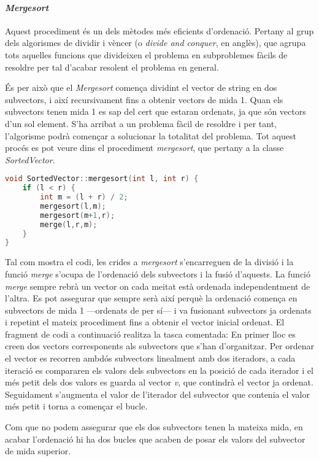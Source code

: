 \documentclass[titlepage]{article}
\begin{document}
\paragraph{\textit{Mergesort}} 
Aquest procediment és un dels mètodes més eficients d'ordenació. Pertany al grup dels algorismes de dividir i vèncer (o \textit{divide and conquer}, en anglès), que agrupa tots aquelles funcions que divideixen el problema en subproblemes fàcils de resoldre per tal d'acabar resolent el problema en general. \newline\par

És per això que el \textit{Mergesort} comença dividint el vector de string en dos subvectors, i així recursivament fins a obtenir  vectors de mida 1. Quan els subvectors tenen mida 1 es sap del cert que estaran ordenats, ja que són vectors d'un sol element. S'ha arribat a un problema fàcil de resoldre i per tant, l'algorisme podrà començar a solucionar la totalitat del problema.\newline
Tot aquest procés es pot veure dins el procediment \textit{mergesort}, que pertany a la classe \textit{SortedVector}.\newline\par


\begin{lstlisting}[language=C++]
void SortedVector::mergesort(int l, int r) {
    if (l < r) {
        int m = (l + r) / 2;
        mergesort(l,m);
        mergesort(m+1,r);
        merge(l,r,m);
    }
}
\end{lstlisting}
Tal com mostra el codi, les crides a \textit{mergesort} s'encarreguen de la divisió i la funció \textit{merge} s'ocupa de l'ordenació dels subvectors i la fusió d'aquests. La funció \textit{merge} sempre rebrà un vector on cada meitat està ordenada independentment de l'altra. Es pot assegurar que sempre serà així perquè la ordenació comença en subvectors de mida 1 —ordenats de per sí— i va fusionant subvectors ja ordenats i repetint el mateix procediment fins a obtenir el vector inicial ordenat.\newline
El fragment de codi a continuació realitza la tasca comentada: En primer lloc es creen dos vectors corresponents als subvectors que s'han d'organitzar. Per ordenar el vector es recorren ambdós subvectors linealment amb dos iteradors, a cada iteració es compararen els valors dels subvectors en la posició de cada iterador i el més petit dels dos valors es guarda al vector \textit{v}, que contindrà el vector ja ordenat. Seguidament s'augmenta el valor de l'iterador del subvector que contenia el valor més petit i torna a començar el bucle.\newline\par
Com que no podem assegurar que els dos subvectors tenen la mateixa mida, en acabar l'ordenació hi ha dos bucles que acaben de posar els valors del subvector de mida superior.
\end{document}
